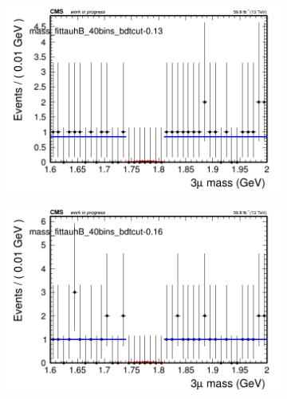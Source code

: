\begin{figure}[H]
\begin{subfigure}{0.2\textwidth}
        \caption{}
    \end{subfigure}
    \begin{subfigure}{0.2\textwidth}
        \includegraphics[width=\textwidth]{flat_fit/plots/tauhB/massfit_tauhB_40bins_bdtcut-0.13.png}
        \caption{}
    \end{subfigure}
    \begin{subfigure}{0.2\textwidth}
        \includegraphics[width=\textwidth]{flat_fit/plots/tauhB/massfit_tauhB_40bins_bdtcut-0.16.png}
        \caption{}
    \end{subfigure}
    \begin{subfigure}{0.2\textwidth}

\end{subfigure}
\end{figure}
